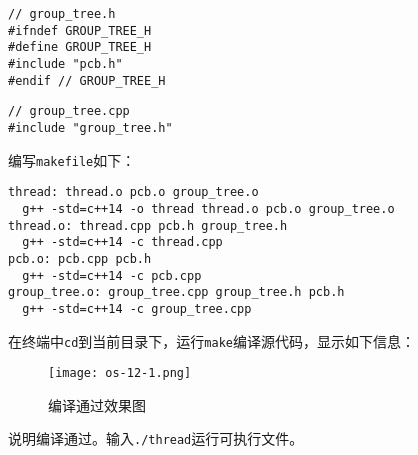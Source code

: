 \documentclass[11pt]{article}
\begin{document}
\begin{center}
\begin{lstlisting}[caption = {\texttt{group\_tree.h}的include关系}, label = {lst: group_tree_h}]
// group_tree.h
#ifndef GROUP_TREE_H
#define GROUP_TREE_H
#include "pcb.h"
#endif // GROUP_TREE_H
\end{lstlisting}
\end{center}

\begin{center}
\begin{lstlisting}[caption = {\texttt{group\_tree.cpp}的include关系}, label = {lst: group_tree_cpp}]
// group_tree.cpp
#include "group_tree.h"
\end{lstlisting}
\end{center}

编写\texttt{makefile}如下：
\begin{center}
\begin{lstlisting}[caption = {\texttt{makefile}代码清单}, label = {lst: makefile}]
thread: thread.o pcb.o group_tree.o
  g++ -std=c++14 -o thread thread.o pcb.o group_tree.o
thread.o: thread.cpp pcb.h group_tree.h
  g++ -std=c++14 -c thread.cpp
pcb.o: pcb.cpp pcb.h
  g++ -std=c++14 -c pcb.cpp
group_tree.o: group_tree.cpp group_tree.h pcb.h
  g++ -std=c++14 -c group_tree.cpp
\end{lstlisting}
\end{center}

在终端中\texttt{cd}到当前目录下，运行\texttt{make}编译源代码，显示如下信息：
\begin{center}
\begin{figure}[htbp]
\texttt{[image: os-12-1.png]}
\caption{编译通过效果图}
\label{fig: compile}
\end{figure}
\end{center}

说明编译通过。输入\texttt{./thread}运行可执行文件。
\end{document}
